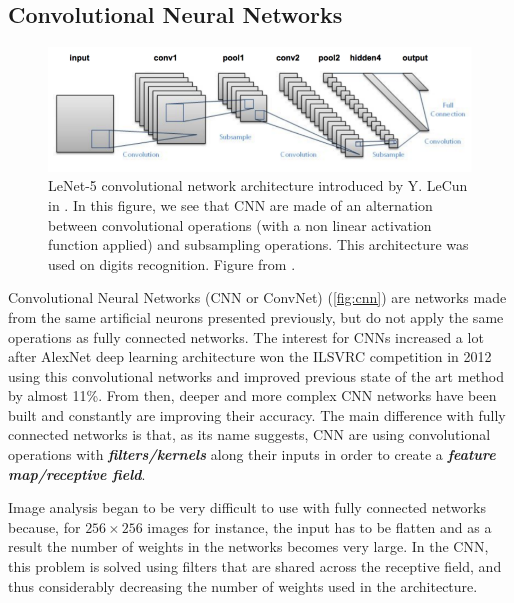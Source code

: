 \documentclass[master, tikz, final,11pt, dvipdfmx]{iscs-thesis}
\begin{document}
\subsection{Convolutional Neural Networks}


\begin{figure}[!h]

\includegraphics[width=\textwidth]{lenet}

	\caption[Architecture of a traditional convolutional neural network.]{LeNet-5 convolutional network architecture introduced by Y. LeCun in \cite{Lecun} . In this figure, we see that CNN are made of an alternation between convolutional operations (with a non linear activation function applied) and subsampling operations. This architecture was used on digits recognition. Figure from \cite{figlecun}.}
	\label{fig:cnn}
\end{figure}


Convolutional Neural Networks (CNN or ConvNet) \cite{unpool,CNNrecent} (\autoref{fig:cnn}) are networks made from the same artificial neurons presented previously, but do not apply the same operations as fully connected networks.
The interest for CNNs increased a lot after AlexNet deep learning architecture won the ILSVRC competition in 2012 using this convolutional networks and improved previous state of the art method by almost 11\%. From then, deeper and more complex CNN networks have been built and constantly are improving their accuracy.
The main difference with fully connected networks is that, as its name suggests, CNN are using convolutional operations with \textbf{\textit{filters/kernels}} along their inputs in order to create a \textbf{\textit{feature map/receptive field}}.

Image analysis began to be very difficult to use with fully connected networks because, for $256\times 256$ images for instance, the input has to be flatten and as a result the number of weights in the networks becomes very large. In the CNN, this problem is solved using filters that are shared across the receptive field, and thus considerably decreasing the number of weights used in the architecture.
\end{document}
